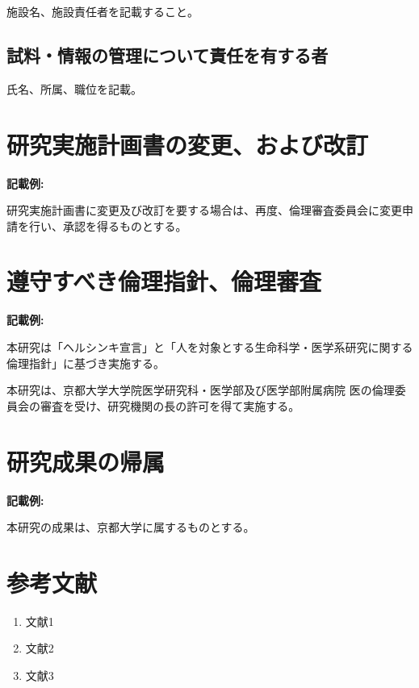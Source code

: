 \documentclass{kyodai-protocol}
\begin{document}
施設名、施設責任者を記載すること。

\subsection{試料・情報の管理について責任を有する者}

氏名、所属、職位を記載。

\section{研究実施計画書の変更、および改訂}
\label{sec:amendments}

\textbf{記載例:}

研究実施計画書に変更及び改訂を要する場合は、再度、倫理審査委員会に変更申請を行い、承認を得るものとする。

\section{遵守すべき倫理指針、倫理審査}
\label{sec:ethics-compliance}

\textbf{記載例:}

本研究は「ヘルシンキ宣言」と「人を対象とする生命科学・医学系研究に関する倫理指針」に基づき実施する。

本研究は、京都大学大学院医学研究科・医学部及び医学部附属病院 医の倫理委員会の審査を受け、研究機関の長の許可を得て実施する。

\section{研究成果の帰属}
\label{sec:ownership}

\textbf{記載例:}

本研究の成果は、京都大学に属するものとする。

\section{参考文献}
\label{sec:references}

\begin{enumerate}
\item 文献1
\item 文献2
\item 文献3
\end{enumerate}
\end{document}
